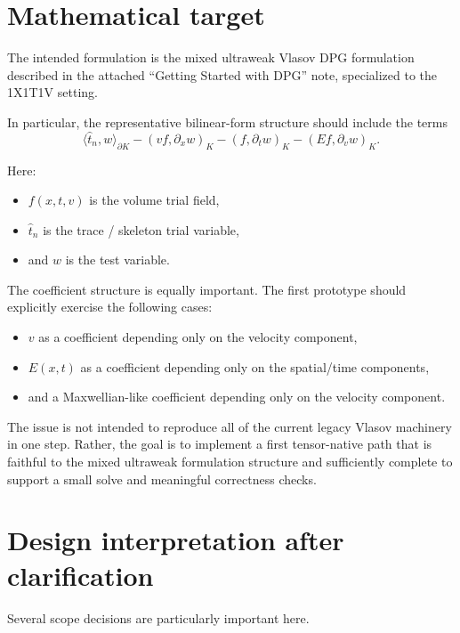 \documentclass[11pt]{article}
\begin{document}
\section{Mathematical target}

The intended formulation is the mixed ultraweak Vlasov DPG formulation described in the attached ``Getting Started with DPG'' note, specialized to the 1X1T1V setting.

In particular, the representative bilinear-form structure should include the terms
\[
\langle \widehat{t}_n, w \rangle_{\partial K}
-
(v f, \partial_x w)_K
-
(f, \partial_t w)_K
-
(E f, \partial_v w)_K.
\]

Here:
\begin{itemize}[leftmargin=2em]
\item \(f(x,t,v)\) is the volume trial field,
\item \(\widehat{t}_n\) is the trace / skeleton trial variable,
\item and \(w\) is the test variable.
\end{itemize}

The coefficient structure is equally important. The first prototype should explicitly exercise the following cases:
\begin{itemize}[leftmargin=2em]
\item \(v\) as a coefficient depending only on the velocity component,
\item \(E(x,t)\) as a coefficient depending only on the spatial/time components,
\item and a Maxwellian-like coefficient depending only on the velocity component.
\end{itemize}

The issue is not intended to reproduce all of the current legacy Vlasov machinery in one step. Rather, the goal is to implement a first tensor-native path that is faithful to the mixed ultraweak formulation structure and sufficiently complete to support a small solve and meaningful correctness checks.

\section{Design interpretation after clarification}

Several scope decisions are particularly important here.
\end{document}
